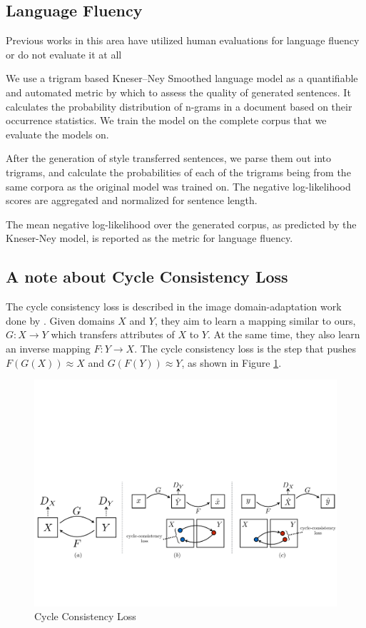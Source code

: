 \subsection{Language Fluency}

Previous works in this area have utilized human evaluations \citep{hu2017toward,shen2017style} for language fluency or do not evaluate it at all \cite{fu2017style}

We use a trigram based Kneser–Ney Smoothed language model \citep{kneser1995improved} as a quantifiable and automated metric by which to assess the quality of generated sentences. It calculates the probability distribution of n-grams in a document based on their occurrence statistics. We train the model on the complete corpus that we evaluate the models on.

After the generation of style transferred sentences, we parse them out into trigrams, and calculate the probabilities of each of the trigrams being from the same corpora as the original model was trained on. The negative log-likelihood scores are aggregated and normalized for sentence length.

The mean negative log-likelihood over the generated corpus, as predicted by the Kneser-Ney model, is reported as the metric for language fluency.


\subsection{A note about Cycle Consistency Loss}

The cycle consistency loss is described in the image domain-adaptation work done by \cite{zhu2017unpaired}. Given domains $X$ and $Y$, they aim to learn a mapping similar to ours, $G: X \rightarrow Y$ which transfers attributes of $X$ to $Y$. At the same time, they also learn an inverse mapping $F: Y \rightarrow X$. The cycle consistency loss is the step that pushes $F(G(X)) \approx X$ and $G(F(Y)) \approx Y$, as shown in Figure \ref{fig:cycle-consistency}.

\begin{figure}[ht]
	\centering
	\includegraphics[width=\textwidth]{images/cycle-consistency}
	\caption{\label{fig:cycle-consistency} Cycle Consistency Loss}
\end{figure}

